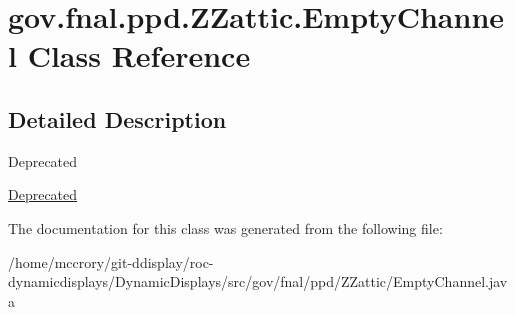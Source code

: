 \hypertarget{classgov_1_1fnal_1_1ppd_1_1ZZattic_1_1EmptyChannel}{\section{gov.\-fnal.\-ppd.\-Z\-Zattic.\-Empty\-Channel Class Reference}
\label{classgov_1_1fnal_1_1ppd_1_1ZZattic_1_1EmptyChannel}
}


\subsection{Detailed Description}
\begin{DoxyRefDesc}{Deprecated}
\item[\hyperlink{deprecated__deprecated000012}{Deprecated}]\end{DoxyRefDesc}


The documentation for this class was generated from the following file\-:\begin{DoxyCompactItemize}
\item 
/home/mccrory/git-\/ddisplay/roc-\/dynamicdisplays/\-Dynamic\-Displays/src/gov/fnal/ppd/\-Z\-Zattic/Empty\-Channel.\-java\end{DoxyCompactItemize}
